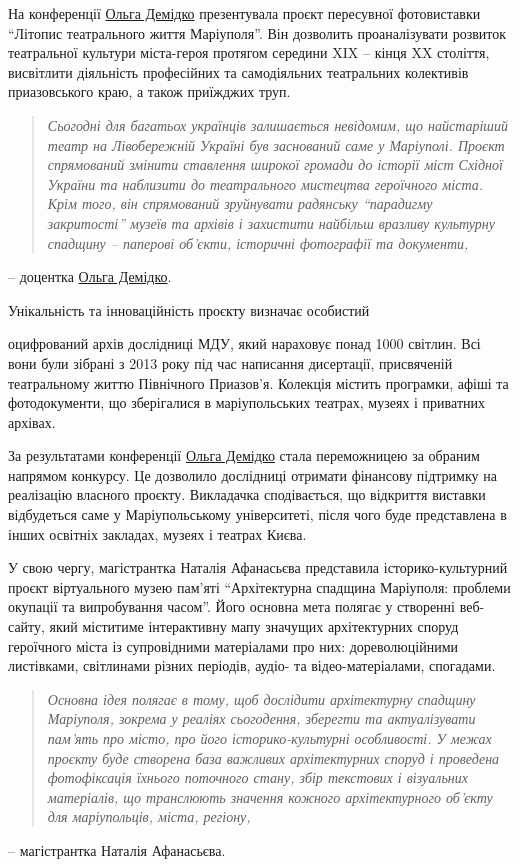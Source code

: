 На конференції \href{\urlDemidkoIA}{Ольга Демідко} презентувала проєкт пересувної фотовиставки
\enquote{Літопис театрального життя Маріуполя}. Він дозволить проаналізувати розвиток
театральної культури міста-героя протягом середини XIX – кінця XX століття,
висвітлити діяльність професійних та самодіяльних театральних колективів
приазовського краю, а також приїжджих труп.

\begin{quote}
\emph{Сьогодні для багатьох українців залишається невідомим, що найстаріший театр на
Лівобережній Україні був заснований саме у Маріуполі. Проєкт спрямований
змінити ставлення широкої громади до історії міст Східної України та наблизити
до театрального мистецтва героїчного міста. Крім того, він спрямований
зруйнувати радянську \enquote{парадигму закритості} музеїв та архівів і захистити
найбільш вразливу культурну спадщину – паперові об'єкти, історичні фотографії
та документи,}
\end{quote}
– доцентка \href{\urlDemidkoIA}{Ольга Демідко}.

Унікальність та інноваційність проєкту визначає особистий\par\noindent оцифрований архів
дослідниці МДУ, який нараховує понад 1000 світлин. Всі вони були зібрані з 2013
року під час написання дисертації, присвяченій театральному життю Північного
Приазов'я. Колекція містить програмки, афіші та фотодокументи, що зберігалися в
маріупольських театрах, музеях і приватних архівах.

За результатами конференції \href{\urlDemidkoIA}{Ольга Демідко} стала переможницею за обраним
напрямом конкурсу. Це дозволило дослідниці отримати фінансову підтримку на
реалізацію власного проєкту. Викладачка сподівається, що відкриття виставки
відбудеться саме у Маріупольському університеті, після чого буде представлена в
інших освітніх закладах, музеях і театрах Києва. 

У свою чергу, магістрантка Наталія Афанасьєва представила історико-культурний
проєкт віртуального музею пам'яті \enquote{Архітектурна спадщина Маріуполя: проблеми
окупації та випробування часом}. Його основна мета полягає у створенні
веб-сайту, який міститиме інтерактивну мапу значущих архітектурних споруд
героїчного міста із супровідними матеріалами про них: дореволюційними
листівками, світлинами різних періодів, аудіо- та відео-матеріалами, спогадами.

\begin{quote}
\emph{Основна ідея полягає в тому, щоб дослідити архітектурну спадщину Маріуполя,
зокрема у реаліях сьогодення, зберегти та актуалізувати пам'ять про місто, про
його історико-культурні особливості. У межах проєкту буде створена база
важливих архітектурних споруд і проведена фотофіксація їхнього поточного стану,
збір текстових і візуальних матеріалів, що транслюють значення кожного
архітектурного об'єкту для маріупольців, міста, регіону,}
\end{quote}
– магістрантка Наталія Афанасьєва.

